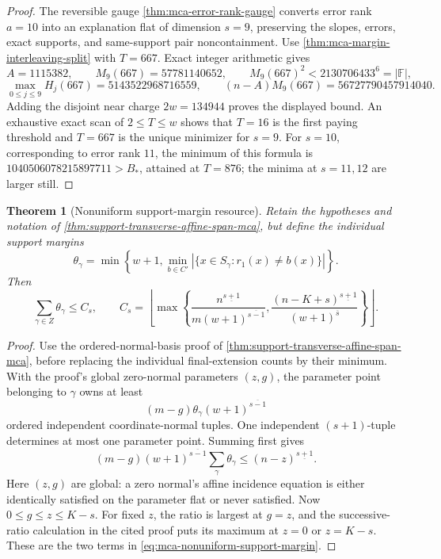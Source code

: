 \documentclass[11pt,a4paper]{amsart}
\numberwithin{equation}{section}
\newtheorem{theorem}{Theorem}[section]
\theoremstyle{remark}
\newcommand{\F}{\mathbb F}\newcommand{\B}{\mathbb B}\newcommand{\K}{\mathbb K}\newcommand{\Z}{\mathbb Z}
\begin{document}
\begin{proof}
The reversible gauge \cref{thm:mca-error-rank-gauge} converts error rank
\(a=10\) into an explanation flat of dimension \(s=9\), preserving the
slopes, errors, exact supports, and same-support pair noncontainment.  Use
\cref{thm:mca-margin-interleaving-split} with \(T=667\).  Exact integer
arithmetic gives
\[
 A=1115382,\qquad
 M_9(667)=57781140652,\qquad
 M_9(667)^2<2130706433^6=|\F|,
\]
\[
 \max_{0\leq j\leq9}H_j(667)=5143522968716559,\qquad
 (n-A)M_9(667)=56727790457914040.
\]
Adding the disjoint near charge \(2w=134944\) proves the displayed bound.
An exhaustive exact scan of \(2\leq T\leq w\) shows that \(T=16\) is the
first paying threshold and \(T=667\) is the unique minimizer for \(s=9\).
For \(s=10\), corresponding to error rank \(11\), the minimum of this
formula is \(1040506078215897711>B_*\), attained at \(T=876\); the
minima at \(s=11,12\) are larger still.
\end{proof}

\begin{theorem}[Nonuniform support-margin resource]
\label{thm:mca-nonuniform-support-margin}
Retain the hypotheses and notation of
\cref{thm:support-transverse-affine-span-mca}, but define the individual
support margins
\[
 \theta_\gamma=\min\left\{w+1,
  \min_{b\in C'}|\{x\in S_\gamma:r_1(x)\ne b(x)\}|\right\}.
\]
Then
\begin{equation}
 \sum_{\gamma\in Z}\theta_\gamma\le C_s,
 \qquad
 C_s=\left\lfloor\max\left\{
 \frac{n^{\underline{s+1}}}{m(w+1)^{\overline{s-1}}},
 \frac{(n-K+s)^{\underline{s+1}}}{(w+1)^{\overline s}}
 \right\}\right\rfloor .
 \label{eq:mca-nonuniform-support-margin}
\end{equation}
\end{theorem}

\begin{proof}
Use the ordered-normal-basis proof of
\cref{thm:support-transverse-affine-span-mca}, before replacing the
individual final-extension counts by their minimum.  With the proof's
global zero-normal parameters \((z,g)\), the parameter point belonging to
\(\gamma\) owns at least
\[
 (m-g)\theta_\gamma(w+1)^{\overline{s-1}}
\]
ordered independent coordinate-normal tuples.  One independent
\((s+1)\)-tuple determines at most one parameter point.  Summing first gives
\[
 (m-g)(w+1)^{\overline{s-1}}
 \sum_\gamma\theta_\gamma
 \le (n-z)^{\underline{s+1}}.
\]
Here \((z,g)\) are global: a zero normal's affine incidence equation is either
identically satisfied on the parameter flat or never satisfied.  Now
\(0\le g\le z\le K-s\).  For fixed \(z\), the ratio is largest at \(g=z\),
and the successive-ratio calculation in the cited proof puts its maximum at
\(z=0\) or \(z=K-s\).  These are the two terms in
\eqref{eq:mca-nonuniform-support-margin}.
\end{proof}
\end{document}
